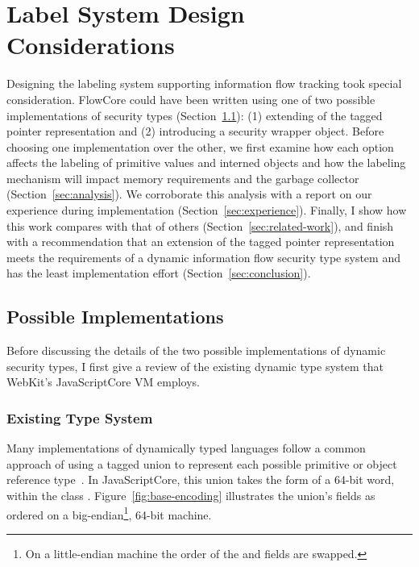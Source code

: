 
\chapter{Label System Design Considerations}

Designing the labeling system supporting information flow tracking took special consideration.
FlowCore could have been written using one of two possible implementations of security types (Section~\ref{sec:implementation}): (1) extending of the tagged pointer representation and (2) introducing a security wrapper object.
Before choosing one implementation over the other, we first examine how each option affects the labeling of primitive values and interned objects and how the labeling mechanism will impact memory requirements and the garbage collector (Section~\ref{sec:analysis}).
We corroborate this analysis with a report on our experience during implementation (Section~\ref{sec:experience}).
Finally, I show how this work compares with that of others (Section~\ref{sec:related-work}), and finish with a recommendation that an extension of the tagged pointer representation meets the requirements of a dynamic information flow security type system and has the least implementation effort (Section~\ref{sec:conclusion}).

\section{Possible Implementations}
\label{sec:implementation}

Before discussing the details of the two possible implementations of dynamic security types, I first give a review of the existing dynamic type system that WebKit's JavaScriptCore VM employs.

\subsection{Existing Type System}

Many implementations of dynamically typed languages follow a common approach of using a tagged union to represent each possible primitive or object reference type~\cite{gudeman1993representing}.
In JavaScriptCore, this union takes the form of a 64-bit word, within the class .
Figure~\ref{fig:base-encoding} illustrates the union's fields as ordered on a big-endian\footnote{On a little-endian machine the order of the  and  fields are swapped.}, 64-bit machine.

